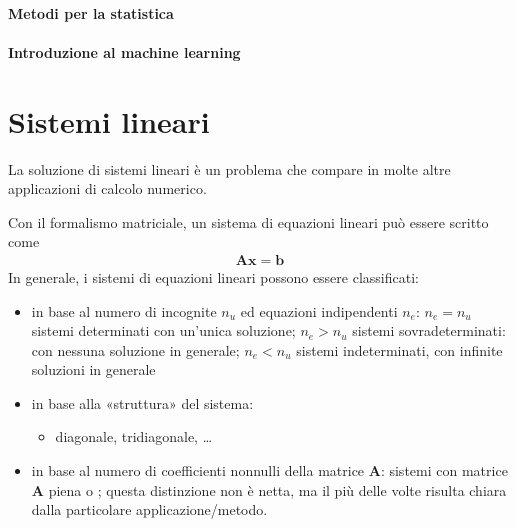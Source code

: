 \documentclass[letterpaper,10pt,italian]{jupyterBook}
\begin{document}
\subsubsection*{Metodi per la statistica}
\subsubsection*{Introduzione al machine learning}

\sphinxstepscope


\chapter{Sistemi lineari}
\label{\detokenize{ch/numerics/linear:sistemi-lineari}}\label{\detokenize{ch/numerics/linear::doc}}
\sphinxAtStartPar
La soluzione di sistemi lineari è un problema che compare in molte altre applicazioni di calcolo numerico.



\sphinxAtStartPar
{} Con il formalismo matriciale, un sistema di equazioni lineari può essere scritto come
\begin{equation*}
\begin{split}\mathbf{A} \mathbf{x} = \mathbf{b}\end{split}
\end{equation*}
\sphinxAtStartPar
{} In generale, i sistemi di equazioni lineari possono essere classificati:
\begin{itemize}
\item {} 
\sphinxAtStartPar
in base al numero di incognite \(n_u\) ed equazioni indipendenti \(n_e\): \(n_e = n_u\) sistemi determinati con un’unica soluzione; \(n_e > n_u\) sistemi sovradeterminati: con nessuna soluzione in generale; \(n_e < n_u\) sistemi indeterminati, con infinite soluzioni in generale

\item {} 
\sphinxAtStartPar
in base alla «struttura» del sistema:
\begin{itemize}
\item {} 
\sphinxAtStartPar
diagonale, tridiagonale, …

\end{itemize}

\item {} 
\sphinxAtStartPar
in base al numero di coefficienti non\sphinxhyphen{}nulli della matrice \(\mathbf{A}\): sistemi con matrice \(\mathbf{A}\) piena o ; questa distinzione non è netta, ma il più delle volte risulta chiara dalla particolare applicazione/metodo.

\end{itemize}
\end{document}
